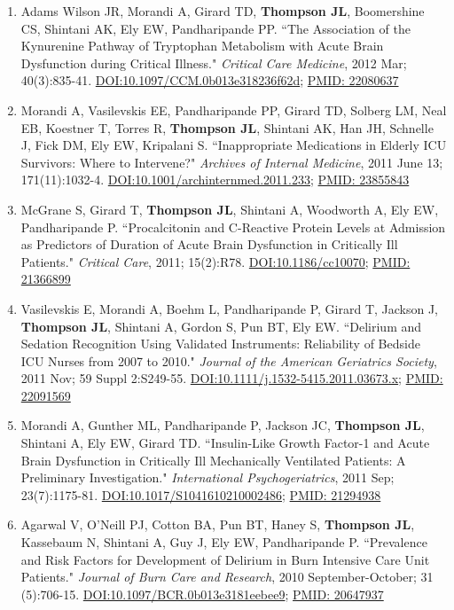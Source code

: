 \documentclass[5pt]{article}
\begin{document}
\begin{enumerate}
\item Adams Wilson JR, Morandi A, Girard TD, \textbf{Thompson JL}, Boomershine CS, Shintani AK, Ely EW, Pandharipande PP. ``The Association of the Kynurenine Pathway of Tryptophan Metabolism with Acute Brain Dysfunction during Critical Illness." \emph{Critical Care Medicine}, 2012 Mar; 40(3):835-41. \href{https://doi.org/10.1097/CCM.0b013e318236f62d}{DOI:10.1097/CCM.0b013e318236f62d}; \href{https://www.ncbi.nlm.nih.gov/pubmed/22080637}{PMID: 22080637}
\item Morandi A, Vasilevskis EE, Pandharipande PP, Girard TD, Solberg LM, Neal EB, Koestner T, Torres R, \textbf{Thompson JL}, Shintani AK, Han JH, Schnelle J, Fick DM, Ely EW, Kripalani S. ``Inappropriate Medications in Elderly ICU Survivors: Where to Intervene?" \emph{Archives of Internal Medicine}, 2011 June 13; 171(11):1032-4. \href{https://doi.org/10.1001/archinternmed.2011.233}{DOI:10.1001/archinternmed.2011.233}; \href{https://www.ncbi.nlm.nih.gov/pubmed/23855843}{PMID: 23855843}
\item McGrane S, Girard T, \textbf{Thompson JL}, Shintani A, Woodworth A, Ely EW, Pandharipande P. ``Procalcitonin and C-Reactive Protein Levels at Admission as Predictors of Duration of Acute Brain Dysfunction in Critically Ill Patients." \emph{Critical Care}, 2011; 15(2):R78. \href{https://doi.org/10.1186/cc10070}{DOI:10.1186/cc10070}; \href{https://www.ncbi.nlm.nih.gov/pubmed/21366899}{PMID: 21366899}
\item Vasilevskis E, Morandi A, Boehm L, Pandharipande P, Girard T, Jackson J, \textbf{Thompson JL}, Shintani A, Gordon S, Pun BT, Ely EW. ``Delirium and Sedation Recognition Using Validated Instruments: Reliability of Bedside ICU Nurses from 2007 to 2010." \emph{Journal of the American Geriatrics Society}, 2011 Nov; 59 Suppl 2:S249-55. \href{https://doi.org/10.1111/j.1532-5415.2011.03673.x}{DOI:10.1111/j.1532-5415.2011.03673.x}; \href{https://www.ncbi.nlm.nih.gov/pubmed/22091569}{PMID: 22091569}
\item Morandi A, Gunther ML, Pandharipande P, Jackson JC, \textbf{Thompson JL}, Shintani A, Ely EW, Girard TD. ``Insulin-Like Growth Factor-1 and Acute Brain Dysfunction in Critically Ill Mechanically Ventilated Patients: A Preliminary Investigation." \emph{International Psychogeriatrics}, 2011 Sep; 23(7):1175-81. \href{https://doi.org/10.1017/S1041610210002486}{DOI:10.1017/S1041610210002486}; \href{https://www.ncbi.nlm.nih.gov/pubmed/21294938}{PMID: 21294938}
\item Agarwal V, O'Neill PJ, Cotton BA, Pun BT, Haney S, \textbf{Thompson JL}, Kassebaum N, Shintani A, Guy J, Ely EW, Pandharipande P. ``Prevalence and Risk Factors for Development of Delirium in Burn Intensive Care Unit Patients." \emph{Journal of Burn Care and Research}, 2010 September-October; 31 (5):706-15. \href{https://doi.org/10.1097/BCR.0b013e3181eebee9}{DOI:10.1097/BCR.0b013e3181eebee9}; \href{https://www.ncbi.nlm.nih.gov/pubmed/20647937}{PMID: 20647937}

\end{enumerate}
\end{document}
